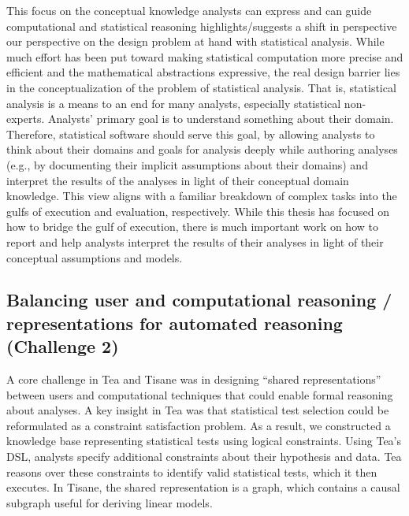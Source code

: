 This focus on the conceptual knowledge analysts can express and can guide
computational and statistical reasoning highlights/suggests a shift in
perspective our perspective on the design problem at hand with statistical
analysis. While much effort has been put toward making statistical computation
more precise and efficient and the mathematical abstractions expressive, the
real design barrier lies in the conceptualization of the problem of statistical
analysis. That is, statistical analysis is a means to an end for many analysts,
especially statistical non-experts. Analysts' primary goal is to understand
something about their domain. Therefore, statistical software should serve this
goal, by allowing analysts to think about their domains and goals for analysis
deeply while authoring analyses (e.g., by documenting their implicit assumptions
about their domains) and interpret the results of the analyses in light of their
conceptual domain knowledge. This view aligns with a familiar breakdown of
complex tasks into the gulfs of execution and evaluation, respectively. While
this thesis has focused on how to bridge the gulf of execution, there is much
important work on how to report and help analysts interpret the results of their
analyses in light of their conceptual assumptions and models. 


\subsection{Balancing user and computational reasoning / representations for automated reasoning (Challenge 2)}

A core challenge in Tea and Tisane was in designing ``shared representations''
between users and computational techniques that could enable formal reasoning
about analyses. A key insight in Tea was that statistical test selection could
be reformulated as a constraint satisfaction problem. As a result, we
constructed a knowledge base representing statistical tests using logical
constraints. Using Tea's DSL, analysts specify additional constraints about
their hypothesis and data. Tea reasons over these constraints to identify valid
statistical tests, which it then executes. In Tisane, the shared representation
is a graph, which contains a causal subgraph useful for deriving linear models. 

